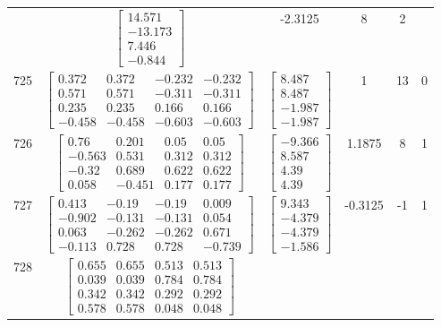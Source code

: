 \documentclass[a4paper,12pt]{article}
\begin{document}
\begin{tabular}{c c c c c c}
&
$\begin{bmatrix} 14.571 \\ -13.173 \\ 7.446 \\ -0.844 \end{bmatrix}$
&
-2.3125
&
8
&
2
\\
725
&
$\begin{bmatrix} 0.372 & 0.372 & -0.232 & -0.232 \\ 0.571 & 0.571 & -0.311 & -0.311 \\ 0.235 & 0.235 & 0.166 & 0.166 \\ -0.458 & -0.458 & -0.603 & -0.603 \end{bmatrix}$
&
$\begin{bmatrix} 8.487 \\ 8.487 \\ -1.987 \\ -1.987 \end{bmatrix}$
&
1
&
13
&
0
\\
726
&
$\begin{bmatrix} 0.76 & 0.201 & 0.05 & 0.05 \\ -0.563 & 0.531 & 0.312 & 0.312 \\ -0.32 & 0.689 & 0.622 & 0.622 \\ 0.058 & -0.451 & 0.177 & 0.177 \end{bmatrix}$
&
$\begin{bmatrix} -9.366 \\ 8.587 \\ 4.39 \\ 4.39 \end{bmatrix}$
&
1.1875
&
8
&
1
\\
727
&
$\begin{bmatrix} 0.413 & -0.19 & -0.19 & 0.009 \\ -0.902 & -0.131 & -0.131 & 0.054 \\ 0.063 & -0.262 & -0.262 & 0.671 \\ -0.113 & 0.728 & 0.728 & -0.739 \end{bmatrix}$
&
$\begin{bmatrix} 9.343 \\ -4.379 \\ -4.379 \\ -1.586 \end{bmatrix}$
&
-0.3125
&
-1
&
1
\\
728
&
$\begin{bmatrix} 0.655 & 0.655 & 0.513 & 0.513 \\ 0.039 & 0.039 & 0.784 & 0.784 \\ 0.342 & 0.342 & 0.292 & 0.292 \\ 0.578 & 0.578 & 0.048 & 0.048 \end{bmatrix}$

\end{tabular}
\end{document}
